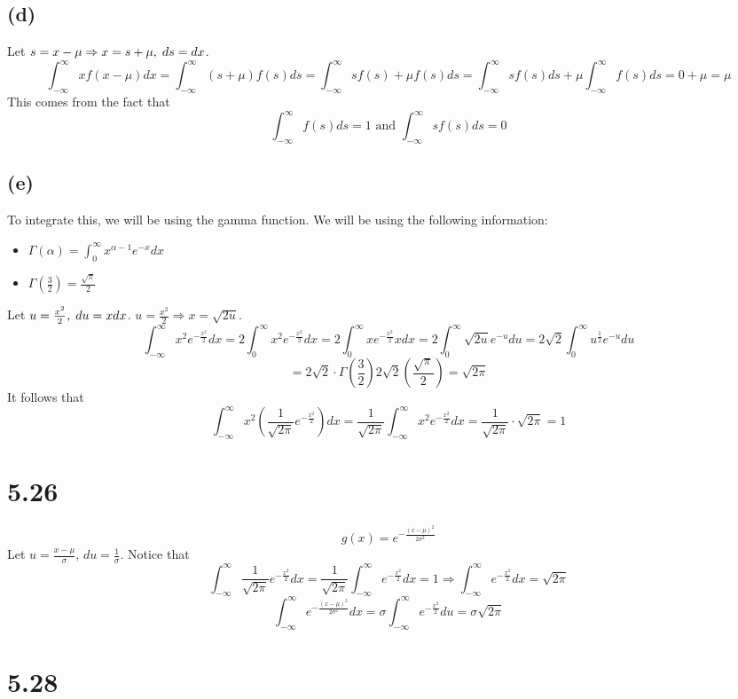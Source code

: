 \documentclass[11pt]{article}
\begin{document}
\subsection*{(d)}
Let $s=x-\mu\Rightarrow x=s+\mu,\hspace{1mm}ds=dx$.
\[\int_{-\infty}^{\infty}xf(x-\mu)dx=\int_{-\infty}^{\infty}(s+\mu)f(s)ds=\int_{-\infty}^{\infty}sf(s)+\mu f(s)ds=\int_{-\infty}^{\infty}sf(s)ds+\mu\int_{-\infty}^{\infty}f(s)ds=0+\mu=\mu\]
This comes from the fact that
\[\int_{-\infty}^{\infty}f(s)ds=1\text{ and }\int_{-\infty}^{\infty}sf(s)ds=0\]
\subsection*{(e)}
To integrate this, we will be using the gamma function. We will be using the following information:
\begin{itemize}
	\item $\Gamma(\alpha)=\int_0^{\infty}x^{\alpha-1}e^{-x}dx$
	\item $\Gamma(\frac{3}{2})=\frac{\sqrt{\pi}}{2}$
\end{itemize}
Let $u=\frac{x^2}{2},\hspace{1mm}du=xdx$. $u=\frac{x^2}{2}\Rightarrow x=\sqrt{2u}$.
\[\int_{-\infty}^{\infty}x^2e^{-\frac{x^2}{2}}dx=2\int_0^{\infty}x^2e^{-\frac{x^2}{2}}dx=2\int_0^{\infty}xe^{-\frac{x^2}{2}}xdx=2\int_0^{\infty}\sqrt{2u}e^{-u}du=2\sqrt{2}\int_0^{\infty}u^{\frac{1}{2}}e^{-u}du\]
\[=2\sqrt{2}\cdot\Gamma\left(\frac{3}{2}\right)2\sqrt{2}\left(\frac{\sqrt{\pi}}{2}\right)=\sqrt{2\pi}\]
It follows that
\[\int_{-\infty}^{\infty}x^2\left(\frac{1}{\sqrt{2\pi}}e^{-\frac{x^2}{2}}\right)dx=\frac{1}{\sqrt{2\pi}}\int_{-\infty}^{\infty}x^2e^{-\frac{x^2}{2}}dx=\frac{1}{\sqrt{2\pi}}\cdot\sqrt{2\pi}=1\]
\clearpage
\section*{5.26}
\[g(x)=e^{-\frac{(x-\mu)^2}{2\sigma^2}}\]
Let $u=\frac{x-\mu}{\sigma}$, $du=\frac{1}{\sigma}$. Notice that
\[\int_{-\infty}^{\infty}\frac{1}{\sqrt{2\pi}}e^{-\frac{x^2}{2}}dx=\frac{1}{\sqrt{2\pi}}\int_{-\infty}^{\infty}e^{-\frac{x^2}{2}}dx=1\Rightarrow\int_{-\infty}^{\infty}e^{-\frac{x^2}{2}}dx=\sqrt{2\pi}\]
\[\int_{-\infty}^{\infty}e^{-\frac{(x-\mu)^2}{2\sigma^2}}dx=\sigma\int_{-\infty}^{\infty}e^{-\frac{x^2}{2}}du=\sigma\sqrt{2\pi}\]

\section*{5.28}
\end{document}

